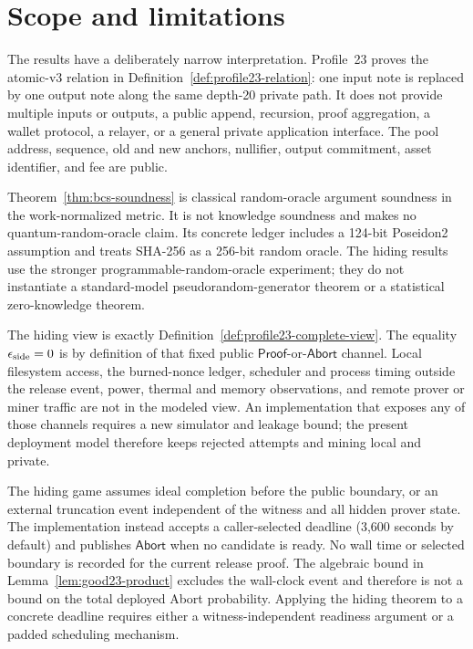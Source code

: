 \section{Scope and limitations}
\label{sec:limitations}

The results have a deliberately narrow interpretation.  Profile~23 proves the
atomic-v3 relation in Definition~\ref{def:profile23-relation}: one input note
is replaced by one output note along the same depth-20 private path.  It does
not provide multiple inputs or outputs, a public append, recursion, proof
aggregation, a wallet protocol, a relayer, or a general private application
interface.  The pool address, sequence, old and new anchors, nullifier, output
commitment, asset identifier, and fee are public.

Theorem~\ref{thm:bcs-soundness} is classical random-oracle argument soundness
in the work-normalized metric.  It is not knowledge soundness and makes no
quantum-random-oracle claim.  Its concrete ledger includes a 124-bit
Poseidon2 assumption and treats SHA-256 as a 256-bit random oracle.  The
hiding results use the stronger programmable-random-oracle experiment; they
do not instantiate a standard-model pseudorandom-generator theorem or a
statistical zero-knowledge theorem.

The hiding view is exactly Definition~\ref{def:profile23-complete-view}.  The
equality \(\epsilon_{\rm side}=0\) is by definition of that fixed public
\(\mathsf{Proof}\)-or-\(\mathsf{Abort}\) channel.  Local filesystem access,
the burned-nonce ledger, scheduler and process timing outside the release
event, power, thermal and memory observations, and remote prover or miner
traffic are not in the modeled view.  An implementation that exposes any of
those channels requires a new simulator and leakage bound; the present
deployment model therefore keeps rejected attempts and mining local and
private.

The hiding game assumes ideal completion before the public boundary, or an
external truncation event independent of the witness and all hidden prover
state.  The implementation instead accepts a caller-selected deadline
(3,600 seconds by default) and publishes \(\mathsf{Abort}\) when no candidate
is ready.  No wall time or selected boundary is recorded for the current
release proof.  The algebraic bound in
Lemma~\ref{lem:good23-product} excludes the wall-clock event and therefore is
not a bound on the total deployed Abort probability.  Applying the hiding
theorem to a concrete deadline requires either a witness-independent readiness
argument or a padded scheduling mechanism.

